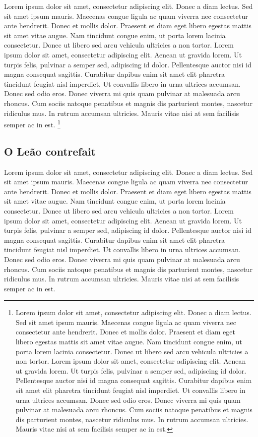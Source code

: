 \documentclass{article}
\begin{document}
Lorem ipsum dolor sit amet, consectetur adipiscing elit. Donec a diam lectus. Sed sit amet ipsum mauris. Maecenas congue ligula ac quam viverra nec consectetur ante hendrerit. Donec et mollis dolor. Praesent et diam eget libero egestas mattis sit amet vitae augue. Nam tincidunt congue enim, ut porta lorem lacinia consectetur. Donec ut libero sed arcu vehicula ultricies a non tortor. Lorem ipsum dolor sit amet, consectetur adipiscing elit. Aenean ut gravida lorem. Ut turpis felis, pulvinar a semper sed, adipiscing id dolor. Pellentesque auctor nisi id magna consequat sagittis. Curabitur dapibus enim sit amet elit pharetra tincidunt feugiat nisl imperdiet. Ut convallis libero in urna ultrices accumsan. Donec sed odio eros. Donec viverra mi quis quam pulvinar at malesuada arcu rhoncus. Cum sociis natoque penatibus et magnis dis parturient montes, nascetur ridiculus mus. In rutrum accumsan ultricies. Mauris vitae nisi at sem facilisis semper ac in est.
\footnote{Lorem ipsum dolor sit amet, consectetur adipiscing elit. Donec a diam lectus. Sed sit amet ipsum mauris. Maecenas congue ligula ac quam viverra nec consectetur ante hendrerit. Donec et mollis dolor. Praesent et diam eget libero egestas mattis sit amet vitae augue. Nam tincidunt congue enim, ut porta lorem lacinia consectetur. Donec ut libero sed arcu vehicula ultricies a non tortor. Lorem ipsum dolor sit amet, consectetur adipiscing elit. Aenean ut gravida lorem. Ut turpis felis, pulvinar a semper sed, adipiscing id dolor. Pellentesque auctor nisi id magna consequat sagittis. Curabitur dapibus enim sit amet elit pharetra tincidunt feugiat nisl imperdiet. Ut convallis libero in urna ultrices accumsan. Donec sed odio eros. Donec viverra mi quis quam pulvinar at malesuada arcu rhoncus. Cum sociis natoque penatibus et magnis dis parturient montes, nascetur ridiculus mus. In rutrum accumsan ultricies. Mauris vitae nisi at sem facilisis semper ac in est.}

\subsection{O Leão contrefait}

Lorem ipsum dolor sit amet, consectetur adipiscing elit. Donec a diam lectus. Sed sit amet ipsum mauris. Maecenas congue ligula ac quam viverra nec consectetur ante hendrerit. Donec et mollis dolor. Praesent et diam eget libero egestas mattis sit amet vitae augue. Nam tincidunt congue enim, ut porta lorem lacinia consectetur. Donec ut libero sed arcu vehicula ultricies a non tortor. Lorem ipsum dolor sit amet, consectetur adipiscing elit. Aenean ut gravida lorem. Ut turpis felis, pulvinar a semper sed, adipiscing id dolor. Pellentesque auctor nisi id magna consequat sagittis. Curabitur dapibus enim sit amet elit pharetra tincidunt feugiat nisl imperdiet. Ut convallis libero in urna ultrices accumsan. Donec sed odio eros. Donec viverra mi quis quam pulvinar at malesuada arcu rhoncus. Cum sociis natoque penatibus et magnis dis parturient montes, nascetur ridiculus mus. In rutrum accumsan ultricies. Mauris vitae nisi at sem facilisis semper ac in est.
\end{document}
